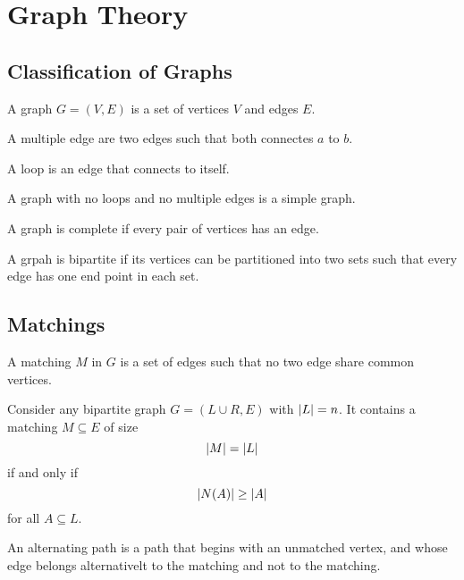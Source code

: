 \documentclass[a4paper]{article}
\begin{document}
\pagebreak
\section{Graph Theory}
\subsection{Classification of Graphs}
\begin{defn} A graph $G=(V,E)$ is a set of vertices $V$ and edges $E$. 
\end{defn}

\begin{defn} A multiple edge are two edges such that both connectes $a$ to $b$. 
\end{defn}

\begin{defn}[Loops] A loop is an edge that connects to itself. 
\end{defn}

\begin{defn} A graph with no loops and no multiple edges is a simple graph. 
\end{defn}

\begin{defn} A graph is complete if every pair of vertices has an edge. 
\end{defn}

\begin{defn} A grpah is bipartite if its vertices can be partitioned into two sets such that every edge has one end point in each set. 
\end{defn}

\subsection{Matchings}
\begin{defn}[Matching] A matching $M$ in $G$ is a set of edges such that no two edge share common vertices. 
\end{defn}

\begin{thm} Consider any bipartite graph $G=(L\cup R,E)$ with $\abs{L}=n$. It contains a matching $M\subseteq E$ of size $$\abs{M}=\abs{L}$$ if and only if $$\abs{N(A)}\geq\abs{A}$$ for all $A\subseteq L$. 
\end{thm}

\begin{defn} An alternating path is a path that begins with an unmatched vertex, and whose edge belongs alternativelt to the matching and not to the matching. 
\end{defn}
\end{document}
